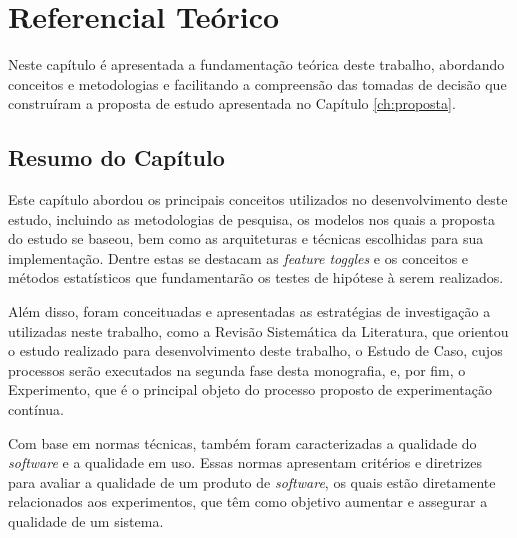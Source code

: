 \chapter{Referencial Teórico}
\label{ch:referencial}

Neste capítulo é apresentada a fundamentação teórica deste trabalho, abordando conceitos e metodologias e facilitando a compreensão das tomadas de decisão que construíram a proposta de estudo apresentada no Capítulo \ref{ch:proposta}.

 







\section{Resumo do Capítulo}

Este capítulo abordou os principais conceitos utilizados no desenvolvimento deste estudo, incluindo as metodologias de pesquisa, os modelos nos quais a proposta do estudo se baseou, bem como as arquiteturas e técnicas escolhidas para sua implementação. Dentre estas se destacam as \textit{feature toggles} e os conceitos e métodos estatísticos que fundamentarão os testes de hipótese à serem realizados.

Além disso, foram conceituadas e apresentadas as estratégias de investigação a utilizadas neste trabalho, como a Revisão Sistemática da Literatura, que orientou o estudo realizado para desenvolvimento deste trabalho, o Estudo de Caso, cujos processos serão executados na segunda fase desta monografia, e, por fim, o Experimento, que é o principal objeto do processo proposto de experimentação contínua.

Com base em normas técnicas, também foram caracterizadas a qualidade do \textit{software} e a qualidade em uso. Essas normas apresentam critérios e diretrizes para avaliar a qualidade de um produto de \textit{software}, os quais estão diretamente relacionados aos experimentos, que têm como objetivo aumentar e assegurar a qualidade de um sistema.
